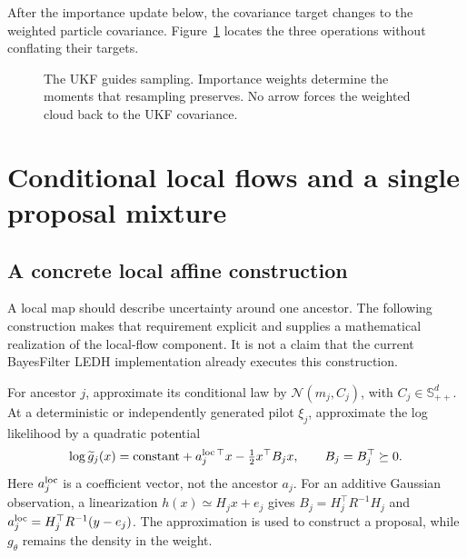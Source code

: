 \documentclass[11pt,a4paper]{article}
\newcommand{\Ncal}{\mathcal N}
\newcommand{\SPD}{\mathbb S_{++}}
\begin{document}
After the importance update below, the covariance target changes to the
weighted particle covariance. Figure~\ref{fig:covariance-roles} locates
the three operations without conflating their targets.
\begin{figure}[htbp]
\centering
{}
\caption{The UKF guides sampling. Importance weights determine the moments
that resampling preserves. No arrow forces the weighted cloud back to
the UKF covariance.}
\label{fig:covariance-roles}
\end{figure}

\section{Conditional local flows and a single proposal mixture}

\subsection{A concrete local affine construction}

A local map should describe uncertainty around one ancestor. The following
construction makes that requirement explicit and supplies a mathematical
realization of the local-flow component. It is not a claim that the current
BayesFilter LEDH implementation already executes this construction.

For ancestor \(j\), approximate its conditional law by
\(\Ncal(m_j,C_j)\), with \(C_j\in\SPD^d\).
At a deterministic or independently generated pilot \(\xi_j\), approximate
the log likelihood by a quadratic potential
\begin{equation}
\label{eq:quadratic-guide}
 \log \widetilde g_j(x)
 =\mathrm{constant}+a_j^{\rm loc\,\top}x-\tfrac12x^\top B_jx,
 \qquad B_j=B_j^\top\succeq0 .
\end{equation}
Here \(a_j^{\rm loc}\) is a coefficient vector, not the ancestor \(a_j\).
For an additive Gaussian observation, a linearization
\(h(x)\simeq H_jx+e_j\) gives
\(B_j=H_j^\top R^{-1}H_j\) and
\(a_j^{\rm loc}=H_j^\top R^{-1}(y-e_j)\).
The approximation is used to construct a proposal, while \(g_\theta\)
remains the density in the weight.
\end{document}
